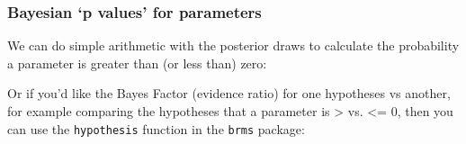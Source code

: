 \documentclass[]{article}
\newenvironment{Shaded}{\begin{snugshade}}{\end{snugshade}}
\newcommand{\CommentTok}[1]{\textcolor[rgb]{0.56,0.35,0.01}{\textit{#1}}}
\newcommand{\DataTypeTok}[1]{\textcolor[rgb]{0.13,0.29,0.53}{#1}}
\newcommand{\DecValTok}[1]{\textcolor[rgb]{0.00,0.00,0.81}{#1}}
\newcommand{\ErrorTok}[1]{\textcolor[rgb]{0.64,0.00,0.00}{\textbf{#1}}}
\newcommand{\FloatTok}[1]{\textcolor[rgb]{0.00,0.00,0.81}{#1}}
\newcommand{\KeywordTok}[1]{\textcolor[rgb]{0.13,0.29,0.53}{\textbf{#1}}}
\newcommand{\NormalTok}[1]{#1}
\newcommand{\OperatorTok}[1]{\textcolor[rgb]{0.81,0.36,0.00}{\textbf{#1}}}
\newcommand{\StringTok}[1]{\textcolor[rgb]{0.31,0.60,0.02}{#1}}
\begin{document}
\hypertarget{bayesian-p-values-for-parameters}{%
\subsubsection*{Bayesian `p values' for parameters}\label{bayesian-p-values-for-parameters}}

We can do simple arithmetic with the posterior draws to calculate the
probability a parameter is greater than (or less than) zero:

\begin{Shaded}
\end{Shaded}

Or if you'd like the Bayes Factor (evidence ratio) for one hypotheses vs
another, for example comparing the hypotheses that a parameter is \textgreater{} vs. \textless{}= 0,
then you can use the \texttt{hypothesis} function in the \texttt{brms} package:
\end{document}
